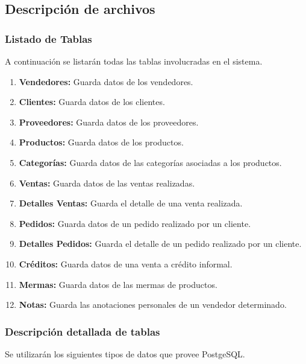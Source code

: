 \documentclass[letterpaper,12pt]{article}
\begin{document}
\newpage

\subsection{Descripción de archivos}


\subsubsection{Listado de Tablas}
A continuación se listarán todas las tablas involucradas en el sistema.
\begin{enumerate}
\item \textbf{Vendedores:} Guarda datos de los vendedores.
\item \textbf{Clientes:} Guarda datos de los clientes.
\item \textbf{Proveedores:} Guarda datos de los proveedores.
\item \textbf{Productos:} Guarda datos de los productos.
\item \textbf{Categorías:} Guarda datos de las categorías asociadas a los productos.
\item \textbf{Ventas:} Guarda datos de las ventas realizadas.
\item \textbf{Detalles Ventas:} Guarda el detalle de una venta realizada.
\item \textbf{Pedidos:} Guarda datos de un pedido realizado por un cliente.
\item \textbf{Detalles Pedidos:} Guarda el detalle de un pedido realizado por un cliente.
\item \textbf{Créditos:} Guarda datos de una venta a crédito informal.
\item \textbf{Mermas:} Guarda datos de las mermas de productos.
\item \textbf{Notas:} Guarda las anotaciones personales de un vendedor determinado.
\end{enumerate}

\newpage

\subsubsection{Descripción detallada de tablas}

Se utilizarán los siguientes tipos de datos que provee PostgeSQL.
\end{document}
